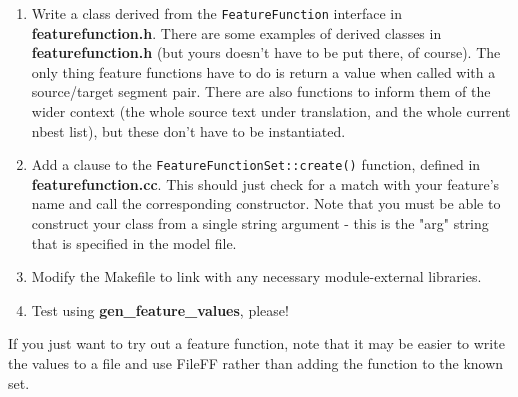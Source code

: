 \documentclass[12pt]{amsart}
\newcommand{\file}{\textbf} \newcommand{\url}{\underline}
\newcommand{\code}[1]{{\small \texttt{#1}}}
\begin{document}
\begin{enumerate}
  
\item Write a class derived from the \code{FeatureFunction} interface in
  \file{featurefunction.h}.  There are some examples of derived classes in
  \file{featurefunction.h} (but yours doesn't have to be put there, of course).
  The only thing feature functions have to do is return a value when called
  with a source/target segment pair.  There are also functions to inform them
  of the wider context (the whole source text under translation, and the whole
  current nbest list), but these don't have to be instantiated.
  
\item Add a clause to the \code{FeatureFunctionSet::create()} function, defined
  in \file{featurefunction.cc}.  This should just check for a match with your
  feature's name and call the corresponding constructor.  Note that you must be
  able to construct your class from a single string argument - this is the
  "arg" string that is specified in the model file.

\item
  Modify the Makefile to link with any necessary module-external libraries.

\item
  Test using \textbf{gen\_feature\_values}, please!

\end{enumerate}

If you just want to try out a feature function, note that it may be easier to
write the values to a file and use FileFF rather than adding the function to
the known set.

 
\end{document}
